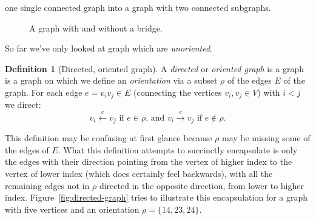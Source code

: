 \documentclass{amsart}
\theoremstyle{plain}
\theoremstyle{remark}
\theoremstyle{definition}
\newtheorem*{definition}{Definition}
\begin{document}
one single connected graph into a graph with two connected subgraphs.
\begin{figure}[h]
  \hspace{1cm}
  \caption[Bridges]{A graph with and without a bridge.}
  \label{fig:bridge}
\end{figure}
So far we've only looked at graph which are \emph{unoriented}.
\begin{definition}[Directed, oriented graph]
  A \emph{directed} or \emph{oriented graph} is a graph is a graph on which we
  define an \emph{orientation} via a subset $\rho$ of the edges $E$ of the
  graph. For each edge $e=v_i v_j\in E$ (connecting the vertices $v_i,v_j\in
  V$) with $i<j$ we direct:
  \[
    v_i\stackrel{e}{\leftarrow}v_j\text{ if }e\in\rho\text{, and }
    v_i\stackrel{e}{\rightarrow}v_j\text{ if }e\notin\rho.
  \]
\end{definition}
This definition may be confusing at first glance because $\rho$
may be missing some of the edges of $E$. What this definition attempts to succinctly
encapsulate is only the edges with their direction pointing from the vertex of higher
index to the vertex of lower index (which does certainly feel backwards),
with all the remaining edges not in $\rho$ directed in the opposite direction,
from lower to higher index.
Figure~\ref{fig:directed-graph} tries to illustrate this encapsulation for a graph
with five vertices and an orientation $\rho=\{14,23,24\}$.
\end{document}
